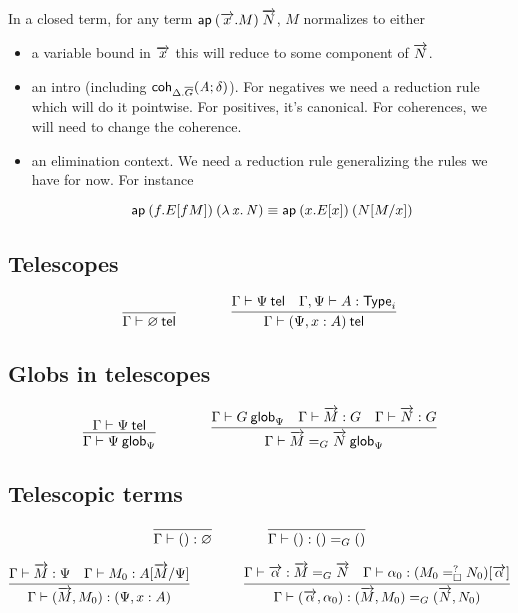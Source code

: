 In a closed term, for any term $\mathsf{ap} \: {(\overrightarrow{x}.M)} \: {\overrightarrow{N}}$, $M$ normalizes to
either
\begin{itemize}
\item a variable bound in $\overrightarrow{x}$ this will reduce to some component of
  $\overrightarrow{N}$.
\item an intro (including $\mathsf{coh}_{\Delta.\overline{G}} \mathit{(A;\delta)}$). For negatives we
  need a reduction rule which will do it pointwise. For positives, it’s
  canonical. For coherences, we will need to change the coherence.
\item an elimination context. We need a reduction rule generalizing the rules we
  have for now. For instance

\[\mathsf{ap} \: {(f.E[f M])} \: {(\mathit{\lambda\,x.\,N})} \equiv \mathsf{ap} \: {(x.E[x])} \: {(N [ M / x])}\]

\end{itemize}



\subsection{Telescopes}

\begin{small}
  \[
  \infer{\wftel{\Gamma}{\varnothing}}{}
  \qquad\qquad
  \infer{\wftel{\Gamma}{(\Psi,x:A)}}
  {\wftel{\Gamma}{\Psi}
    & \wftype{\Gamma,\Psi}{A}}
  \]
\end{small}

\subsection{Globs in telescopes}

\begin{small}
  \[
  \infer{\wfglob{\Gamma}{\Psi}{}{\Psi}}
  {\wftel{\Gamma}{\Psi}}
  \qquad\qquad
  \infer{\wfglob{\Gamma}{\homj{G}{\tel{M}}{\tel{N}}}{}{\Psi}}
  {\wfglob{\Gamma}{G}{}{\Psi}
    & \ofglob{\Gamma}{\tel{M}}{G}
    & \ofglob{\Gamma}{\tel{N}}{G}}
  \]
\end{small}

\subsection{Telescopic terms}

\begin{small}
  \[
  \infer{\ofglob{\Gamma}{()}{}{\varnothing}}{}
  \qquad\qquad
  \infer{\ofglob{\Gamma}{()}{}{\homj{G}{()}{()}}}{}
  \]

  \[
  \infer{\ofglob{\Gamma}{(\tel{M},M_0)}{}{(\Psi,x:A)}}
  {\ofglob{\Gamma}{\tel{M}}{}{\Psi}
    & \ofglob{\Gamma}{M_0}{}{\subst{A}{\tel{M}}{\Psi}}}
  \qquad\qquad
  \infer{\ofglob{\Gamma}{(\tel{\alpha},\alpha_0)}{}
    {\homj{G}{(\tel{M},M_0)}{(\tel{N},N_0)}}}
  {\ofglob{\Gamma}{\tel\alpha}{}{\homj{G}{\tel{M}}{\tel{N}}}
    & \ofdepglob{\Gamma}{\alpha_0}{(\dhomj{?}{M_0}{N_0}{\blank})}{\tel\alpha}}
  \]
\end{small}

